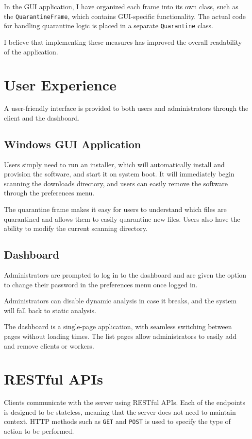 In the GUI application, I have organized each frame into its own class,
such as the \texttt{QuarantineFrame}, which contains GUI-specific functionality.
The actual code for handling quarantine logic is placed in a separate \texttt{Quarantine} class.

I believe that implementing these measures has improved
the overall readability of the application.

\section{User Experience}
A user-friendly interface is provided to both users and
administrators through the client and the dashboard.

\subsection{Windows GUI Application}
Users simply need to run an installer,
which will automatically install and provision the software,
and start it on system boot.
It will immediately begin scanning the downloads directory,
and users can easily remove the software through the preferences menu.

The quarantine frame makes it easy for users to understand which
files are quarantined and allows them to easily quarantine new files.
Users also have the ability to modify the current scanning directory.

\subsection{Dashboard}
Administrators are prompted to log in to the dashboard and are
given the option to change their password in the
preferences menu once logged in.

Administrators can disable dynamic analysis in case it breaks,
and the system will fall back to static analysis.

The dashboard is a single-page application, with seamless switching
between pages without loading times.
The list pages allow administrators to easily add and remove clients or workers.

\section{RESTful APIs}
Clients communicate with the server using RESTful APIs.
Each of the endpoints is designed to be stateless,
meaning that the server does not need to maintain context.
HTTP methods such as \texttt{GET} and \texttt{POST} is used
to specify the type of action to be performed.

